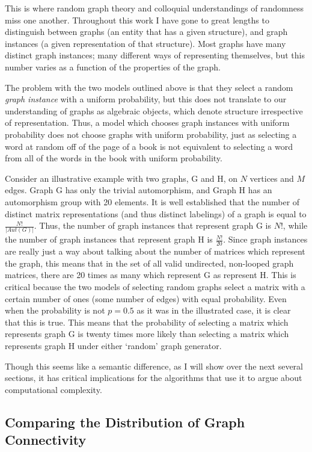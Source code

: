 This is where random graph theory and colloquial understandings of randomness miss one another.
Throughout this work I have gone to great lengths to distinguish between graphs (an entity that has a given structure), and graph instances (a given representation of that structure).
Most graphs have many distinct graph instances; many different ways of representing themselves, but this number varies as a function of the properties of the graph.

The problem with the two models outlined above is that they select a random \emph{graph instance} with a uniform probability, but this does not translate to our understanding of graphs as algebraic objects, which denote structure irrespective of representation.
Thus, a model which chooses graph instances with uniform probability does not choose graphs with uniform probability, just as selecting a word at random off of the page of a book is not equivalent to selecting a word from all of the words in the book with uniform probability.

Consider an illustrative example with two graphs, G and H, on $N$ vertices and $M$ edges.
Graph G has only the trivial automorphism, and Graph H has an automorphism group with 20 elements.
It is well established that the number of distinct matrix representations (and thus distinct labelings) of a graph is equal to $\frac{N!}{|Aut(G)|}$.
Thus, the number of graph instances that represent graph G is $N!$, while the number of graph instances that represent graph H is $\frac{N!}{20}$.
Since graph instances are really just a way about talking about the number of matrices which represent the graph, this means that in the set of all valid undirected, non-looped graph matrices, there are 20 times as many which represent G as represent H.
This is critical because the two models of selecting random graphs select a matrix with a certain number of ones (some number of edges) with equal probability.
Even when the probability is not $p=0.5$ as it was in the illustrated case, it is clear that this is true.
This means that the probability of selecting a matrix which represents graph G is twenty times more likely than selecting a matrix which represents graph H under either `random' graph generator.

Though this seems like a semantic difference, as I will show over the next several sections, it has critical implications for the algorithms that use it to argue about computational complexity.

\subsection{Comparing the Distribution of Graph Connectivity}

